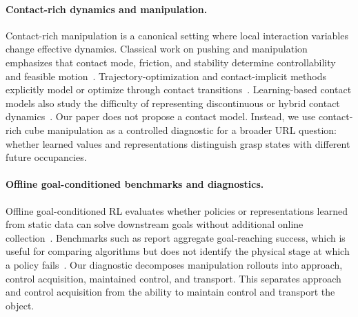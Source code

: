 \paragraph{Contact-rich dynamics and manipulation.}
Contact-rich manipulation is a canonical setting where local interaction variables change effective dynamics.
Classical work on pushing and manipulation emphasizes that contact mode, friction, and stability determine controllability and feasible motion~\citep{mason-ijrr86a,lynch-ijrr96a}.
Trajectory-optimization and contact-implicit methods explicitly model or optimize through contact transitions~\citep{posa-ijrr14a,manchester-isrr17a,patel-ral19a,aceituno-rss20a,jin-arxiv24a}.
Learning-based contact models also study the difficulty of representing discontinuous or hybrid contact dynamics~\citep{hogan-arxiv16a,pfrommer-corl20a}.
Our paper does not propose a contact model.
Instead, we use contact-rich cube manipulation as a controlled diagnostic for a broader URL question: whether learned values and representations distinguish grasp states with different future occupancies.

\paragraph{Offline goal-conditioned benchmarks and diagnostics.}
Offline goal-conditioned RL evaluates whether policies or representations learned from static data can solve downstream goals without additional online collection~\citep{kostrikov-iclr22a,ma-neurips22a,park-iclr25a}.
Benchmarks such as \ogbench{} report aggregate goal-reaching success, which is useful for comparing algorithms but does not identify the physical stage at which a policy fails~\citep{park-iclr25a}.
Our diagnostic decomposes manipulation rollouts into approach, control acquisition, maintained control, and transport.
This separates approach and control acquisition from the ability to maintain control and transport the object.
